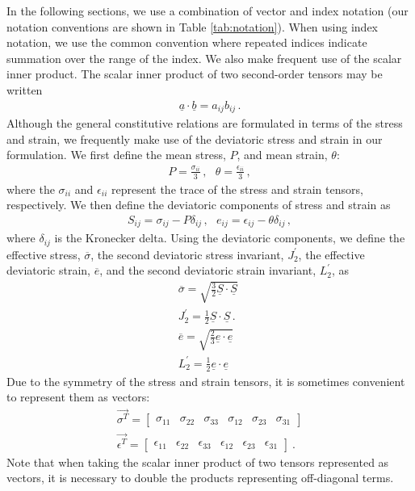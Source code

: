 In the following sections, we use a combination of vector and index
notation (our notation conventions are shown in Table \vref{tab:notation}).
When using index notation, we use the common convention where repeated
indices indicate summation over the range of the index. We also make
frequent use of the scalar inner product. The scalar inner product
of two second-order tensors may be written
\begin{gather}
\underline{a}\cdot\underline{b}=a_{ij}b_{ij}\,.\label{eq:14}
\end{gather}
Although the general constitutive relations are formulated in terms
of the stress and strain, we frequently make use of the deviatoric
stress and strain in our formulation. We first define the mean stress,
$P$, and mean strain, $\theta$:
\begin{gather}
P=\frac{\sigma_{ii}}{3}\,,\,\,\,\,\theta=\frac{\epsilon_{ii}}{3}\,,\label{eq:15}
\end{gather}
where the $\sigma_{ii}$ and $\epsilon_{ii}$ represent the trace
of the stress and strain tensors, respectively. We then define the
deviatoric components of stress and strain as
\begin{gather}
S_{ij}=\sigma_{ij}-P\delta_{ij}\,,\,\,\,\, e_{ij}=\epsilon_{ij}-\theta\delta_{ij}\,,\label{eq:16}
\end{gather}
where $\delta_{ij}$ is the Kronecker delta. Using the deviatoric
components, we define the effective stress, $\overline{\sigma}$,
the second deviatoric stress invariant, $J_{2}^{\prime}$, the effective
deviatoric strain, $\overline{e}$, and the second deviatoric strain
invariant, $L_{2}^{\prime}$, as
\begin{gather}
\overline{\sigma}=\sqrt{\frac{3}{2}\underline{S}\cdot\underline{S}}\,\,\nonumber \\
J_{2}^{\prime}=\frac{1}{2}\underline{S}\cdot\underline{S}\,.\label{eq:17}\\
\overline{e}=\sqrt{\frac{2}{3}\underline{e}\cdot\underline{e}}\,\,\nonumber \\
L_{2}^{\prime}=\frac{1}{2}\underline{e}\cdot\underline{e}\,\,\nonumber 
\end{gather}
Due to the symmetry of the stress and strain tensors, it is sometimes
convenient to represent them as vectors:
\begin{gather}
\overrightarrow{\sigma^{T}}=\left[\begin{array}{cccccc}
\sigma_{11} & \sigma_{22} & \sigma_{33} & \sigma_{12} & \sigma_{23} & \sigma_{31}\end{array}\right]\label{eq:18}\\
\overrightarrow{\epsilon^{T}}=\left[\begin{array}{cccccc}
\epsilon_{11} & \epsilon_{22} & \epsilon_{33} & \epsilon_{12} & \epsilon_{23} & \epsilon_{31}\end{array}\right]\:.\nonumber 
\end{gather}
Note that when taking the scalar inner product of two tensors represented
as vectors, it is necessary to double the products representing off-diagonal
terms.

